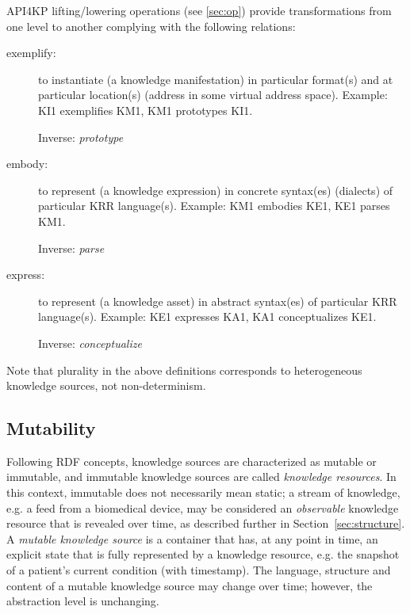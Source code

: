 \documentclass[runningheads]{llncs}
\begin{document}
API4KP lifting/lowering operations (see \ref{sec:op}) provide transformations from one level to another complying with the following relations:
\begin{description}
\item[exemplify:] to instantiate (a knowledge manifestation) in particular format(s) and at particular location(s) (address in some virtual address space). Example: KI1 exemplifies KM1, KM1 prototypes KI1.

Inverse: \emph{prototype}
\item[embody:] to represent (a knowledge expression) in concrete syntax(es) (dialects) of particular KRR language(s). Example: KM1 embodies KE1, KE1 parses KM1.

Inverse: \emph{parse}
\item[express:] to represent (a knowledge asset) in abstract syntax(es) of particular KRR language(s). Example: KE1 expresses KA1, KA1 conceptualizes KE1.

Inverse: \emph{conceptualize}
\end{description}
Note that plurality in the above definitions corresponds to heterogeneous knowledge sources, not non-determinism.

\vspace{-0.3cm}
\subsection{Mutability}
Following RDF concepts\cite{RDF2014}, knowledge sources are characterized as mutable or immutable, and immutable knowledge sources are called \emph{knowledge resources}. In this context, immutable does not necessarily mean static;  a stream of knowledge, e.g. a feed from a biomedical device, may be considered an \emph{observable} knowledge resource that is revealed over time, as described further in Section~\ref{sec:structure}.
A \emph{mutable knowledge source} is a container that has, at any point in time, an explicit state that is fully represented by a knowledge resource, e.g. the snapshot of a patient's current condition (with timestamp). The language, structure and content of a mutable knowledge source may change over time; however, the abstraction level is unchanging. 
\end{document}

